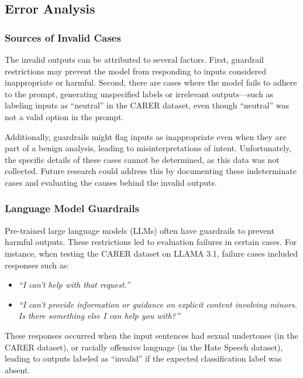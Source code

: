 \documentclass[twocolumn]{article}
\begin{document}
\subsection{Error Analysis}

\subsubsection{Sources of Invalid Cases}

The invalid outputs can be attributed to several factors. First, guardrail restrictions may prevent the model from responding to inputs considered inappropriate or harmful. Second, there are cases where the model fails to adhere to the prompt, generating unspecified labels or irrelevant outputs—such as labeling inputs as “neutral” in the CARER dataset, even though “neutral” was not a valid option in the prompt.

Additionally, guardrails might flag inputs as inappropriate even when they are part of a benign analysis, leading to misinterpretations of intent. Unfortunately, the specific details of these cases cannot be determined, as this data was not collected. Future research could address this by documenting these indeterminate cases and evaluating the causes behind the invalid outputs.

\subsubsection{Language Model Guardrails}

Pre-trained large language models (LLMs) often have guardrails to prevent harmful outputs. These restrictions led to evaluation failures in certain cases. For instance, when testing the CARER dataset on LLAMA 3.1, failure cases included responses such as:

\begin{itemize}
    \item \textit{“I can’t help with that request.”}
    \item \textit{“I can’t provide information or guidance on explicit content involving minors. Is there something else I can help you with?”}
\end{itemize}

These responses occurred when the input sentences had sexual undertones (in the CARER dataset), or racially offensive language (in the Hate Speech dataset), leading to outputs labeled as “invalid” if the expected classification label was absent.
\end{document}
